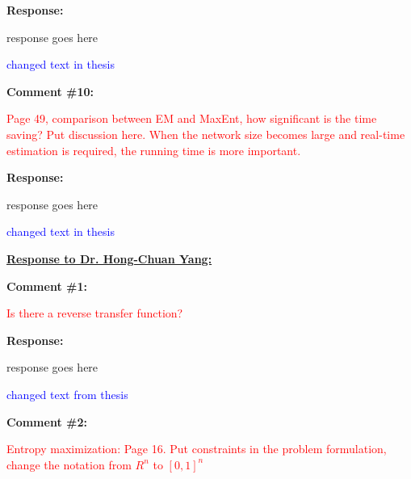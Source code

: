 \documentclass[journal]{IEEEtran}
\begin{document}
\vspace{10pt}
\textbf{Response:}
\begin{adjustwidth}{2.5em}{0pt}
response goes here

\vspace{10pt}
\noindent\textcolor{blue}{changed text in thesis}
\end{adjustwidth}

\vspace{30pt}
\textbf{Comment \#10:}
\begin{adjustwidth}{2.5em}{0pt}
\singlespacing \vspace{-10pt}
\textcolor{red}{Page 49, comparison between EM and MaxEnt, how significant is the time saving? Put discussion here. When the network size becomes large and real-time estimation is required, the running time is more important.}
\end{adjustwidth}

\vspace{10pt}
\textbf{Response:}
\begin{adjustwidth}{2.5em}{0pt}
response goes here

\vspace{10pt}
\noindent\textcolor{blue}{changed text in thesis}
\end{adjustwidth}






\vspace{50pt}
 \Large
\noindent \textbf{\underline{Response to Dr. Hong-Chuan Yang:}}
 \large
 
 \vspace{10pt}
\textbf{Comment \#1:}
\begin{adjustwidth}{2.5em}{0pt}
\singlespacing \vspace{-10pt}
\textcolor{red}{Is there a reverse transfer function?}
\end{adjustwidth}

\vspace{10pt}
\textbf{Response:}
\begin{adjustwidth}{2.5em}{0pt}
response goes here

\vspace{10pt}
\noindent\textcolor{blue}{changed text from thesis}
\end{adjustwidth}


\vspace{30pt}
\textbf{Comment \#2:}
\begin{adjustwidth}{2.5em}{0pt}
\singlespacing \vspace{-10pt}
\textcolor{red}{Entropy maximization: Page 16. Put constraints in the problem formulation, change the notation from $R^n$ to $[0,1]^n$}
\end{adjustwidth}
\end{document}
